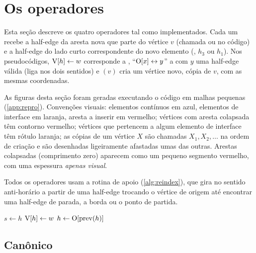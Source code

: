 \section{Os operadores}
\label{sec:operadores}

Esta seção descreve os quatro operadores tal como implementados. Cada um recebe a half-edge da aresta nova que parte do
vértice $v$ (chamada  ou  no código) e a half-edge do lado curto correspondente do novo elemento
(, $h_3$ ou $h_1$). Nos pseudocódigos, $\mathrm{V}[h]\leftarrow w$ corresponde a ,
``$\mathrm{O}[x]\leftrightarrow y$'' a  com $y$ uma half-edge válida (liga nos dois sentidos) e
$(v)$ cria um vértice novo, cópia de $v$, com as mesmas coordenadas.

As figuras desta seção foram geradas executando o código em malhas pequenas (\cref{app:repro}). Convenções visuais:
elementos contínuos em azul, elementos de interface em laranja, aresta a inserir em vermelho; vértices com aresta
colapsada têm contorno vermelho; vértices que pertencem a algum elemento de interface têm rótulo laranja; as cópias de
um vértice $X$ são chamadas $X_1, X_2,\dots$ na ordem de criação e são desenhadas ligeiramente afastadas umas das
outras. Arestas colapsadas (comprimento zero) aparecem como um pequeno segmento vermelho, com uma espessura
\emph{apenas visual}.

Todos os operadores usam a rotina de apoio  (\cref{alg:reindex}), que gira no sentido
anti-horário a partir de uma half-edge trocando o vértice de origem até encontrar uma half-edge de parada, a borda ou o
ponto de partida.

\begin{algorithm}[ht]
\caption{$(h, \mathit{stop}, w)$}
\label{alg:reindex}
\begin{algorithmic}[1]
\State $s\gets h$
\Repeat
  \State $\mathrm{V}[h]\gets w$ 
  \State $h\gets \mathrm{O}[\mathrm{prev}(h)]$ 
\end{algorithmic}
\end{algorithm}

\subsection{Canônico}
\label{sec:canonico}

